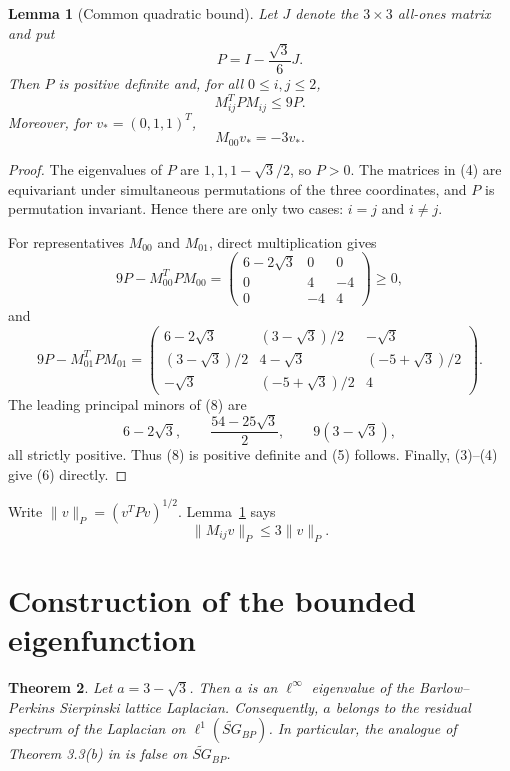 \documentclass[11pt]{article}
\newtheorem{theorem}{Theorem}
\newtheorem{lemma}[theorem]{Lemma}
\newcommand{\SG}{\widetilde{SG}}
\begin{document}
\begin{lemma}[Common quadratic bound]\label{lem:matrix}
Let $J$ denote the $3\times3$ all-ones matrix and put
\[
 P=I-\frac{\sqrt3}{6}J.
\]
Then $P$ is positive definite and, for all $0\le i,j\le2$,
\[
 M_{ij}^{T}PM_{ij}\le9P.                                    \tag{5}
\]
Moreover, for $v_*=(0,1,1)^T$,
\[
 M_{00}v_*=-3v_*.                                            \tag{6}
\]
\end{lemma}

\begin{proof}
The eigenvalues of $P$ are $1,1,1-\sqrt3/2$, so $P>0$. The matrices in
(4) are equivariant under simultaneous permutations of the three
coordinates, and $P$ is permutation invariant. Hence there are only two
cases: $i=j$ and $i\ne j$.

For representatives $M_{00}$ and $M_{01}$, direct multiplication gives
\[
 9P-M_{00}^{T}PM_{00}=
 \begin{pmatrix}
 6-2\sqrt3&0&0\\0&4&-4\\0&-4&4
 \end{pmatrix}\ge0,                                        \tag{7}
\]
and
\[
 9P-M_{01}^{T}PM_{01}=
 \begin{pmatrix}
 6-2\sqrt3&(3-\sqrt3)/2&-\sqrt3\\
 (3-\sqrt3)/2&4-\sqrt3&(-5+\sqrt3)/2\\
 -\sqrt3&(-5+\sqrt3)/2&4
 \end{pmatrix}.                                             \tag{8}
\]
The leading principal minors of (8) are
\[
 6-2\sqrt3,\qquad \frac{54-25\sqrt3}{2},\qquad
 9(3-\sqrt3),
\]
all strictly positive. Thus (8) is positive definite and (5) follows.
Finally, (3)--(4) give (6) directly.
\end{proof}

Write $\|v\|_P=(v^TPv)^{1/2}$. Lemma~\ref{lem:matrix} says
\[
 \|M_{ij}v\|_P\le3\|v\|_P.                                 \tag{9}
\]

\section{Construction of the bounded eigenfunction}

\begin{theorem}\label{thm:counterexample}
Let $a=3-\sqrt3$. Then $a$ is an $\ell^\infty$ eigenvalue of the
Barlow--Perkins Sierpinski lattice Laplacian. Consequently, $a$ belongs to
the residual spectrum of the Laplacian on $\ell^1(\SG_{BP})$.
In particular, the analogue of Theorem 3.3(b) in \cite{CHQSZ} is false on
$\SG_{BP}$.
\end{theorem}
\end{document}
